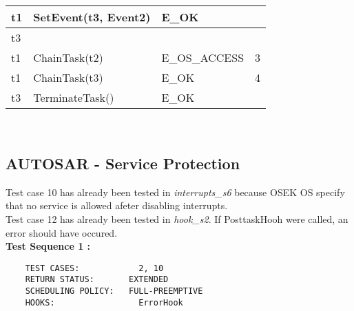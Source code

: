 \documentclass[10pt]{article}
\newlength{\Li}\settowidth{\Li}{Running}
\newlength{\Lii}\setlength{\Lii}{7cm}
\newlength{\Liiii}\setlength{\Liiii}{0.9cm}
\newlength{\Liii}\setlength{\Liii}{\textwidth} \addtolength{\Liii}{-\Li} \addtolength{\Liii}{-\Lii} \addtolength{\Liii}{-\Liiii}
\begin{document}
\begin{supertabular}{|p{\Li}|p{\Lii}|p{\Liii}|p{\Liiii}|}
	t1		& SetEvent(t3, Event2)							& E\_OK							& \\ \hline
	t3		&											&								& \\ \hline
	t1		& ChainTask(t2)								& E\_OS\_ACCESS					& 3 \\ \hline
	t1		& ChainTask(t3)								& E\_OK							& 4 \\ \hline
	t3		& TerminateTask()								& E\_OK							& \\ \hline
	\end{supertabular}\\
		
\subsection{AUTOSAR - Service Protection}
	
	Test case 10 has already been tested in \textit{interrupts\_s6} because OSEK OS specify that no service is allowed afeter disabling interrupts. \\ 
	Test case 12 has already been tested in \textit{hook\_s2}. If PosttaskHooh were called, an error should have occured.\\
	
	\textbf{Test Sequence 1 :}
	\begin{lstlisting}
	TEST CASES:		       2, 10
	RETURN STATUS:	  	 EXTENDED
	SCHEDULING POLICY:   FULL-PREEMPTIVE
	HOOKS:		           ErrorHook
	\end{lstlisting}
	
\end{document}
